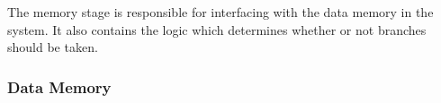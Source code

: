 The memory stage is responsible for interfacing with the data memory in the system.
It also contains the logic which determines whether or not branches should be taken.

\subsubsection{Data Memory}

